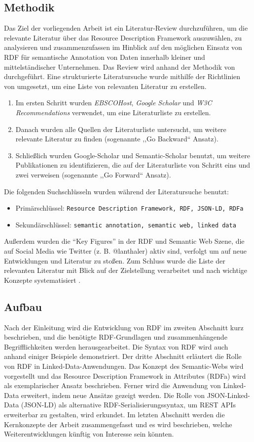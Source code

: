 \subsection{Methodik}
Das Ziel der vorliegenden Arbeit ist ein Literatur-Review durchzuführen, um die relevante Literatur über das Resource Description Framework auszuwählen, zu analysieren und zusammenzufassen im Hinblick auf den möglichen Einsatz von RDF für semantische Annotation von Daten innerhalb kleiner und mittelständischer Unternehmen. Das Review wird anhand der Methodik von \cite{fettke2006state} durchgeführt. Eine strukturierte Literatursuche wurde mithilfe der Richtlinien von \cite[S. XVI]{webster2002analyzing} umgesetzt, um eine Liste von relevanten Literatur zu erstellen. 
\begin{enumerate}
	\item Im ersten Schritt wurden \emph{EBSCOHost}, \emph{Google Scholar} und \emph{W3C Recommendations} verwendet, um eine Literaturliste zu erstellen.
	\item Danach wurden alle Quellen der Literaturliste untersucht, um weitere relevante Literatur zu finden (sogenannte ,,Go Backward`` Ansatz).
	\item Schließlich wurden Google-Scholar und Semantic-Scholar benutzt, um weitere Publikationen zu identifizieren, die auf der Literaturliste von Schritt eins und zwei verweisen (sogenannte ,,Go Forward`` Ansatz).
\end{enumerate}
Die folgenden Suchschlüsseln wurden während der Literatursuche benutzt:
\begin{itemize}
	\item Primärschlüssel: \texttt{Resource Description Framework, RDF, JSON-LD, RDFa}
	\item Sekundärschlüssel: \texttt{semantic annotation, semantic web, linked data}
\end{itemize}
Außerdem wurden die \hyphenquote{german}{Key Figures} in der RDF und Semantic Web Szene, die auf Social Media wie Twitter (z. B. @lanthaler) aktiv sind, verfolgt um auf neue Entwicklungen und Literatur zu stoßen. Zum Schluss wurde die Liste der relevanten Literatur mit Blick auf der Zielstellung verarbeitet und nach wichtige Konzepte systematisiert \parencite[vgl.][S. XVI]{webster2002analyzing}.
\subsection{Aufbau}
Nach der Einleitung wird die Entwicklung von RDF im zweiten Abschnitt kurz beschrieben, und die benötigte RDF-Grundlagen und zusammenhängende Begrifflichkeiten werden herausgearbeitet. Die Syntax von RDF wird auch anhand einiger Beispiele demonstriert. Der dritte Abschnitt erläutert die Rolle von RDF in Linked-Data-Anwendungen. Das Konzept des Semantic-Webs wird vorgestellt und das Resource Description Framework in Attributes (RDFa) wird als exemplarischer Ansatz beschrieben. Ferner wird die Anwendung von Linked-Data erweitert, indem neue Ansätze gezeigt werden. Die Rolle von JSON-Linked-Data (JSON-LD) als alternative RDF-Serialisierungssyntax, um REST APIs erweiterbar zu gestalten, wird erkundet. Im letzten Abschnitt werden die Kernkonzepte der Arbeit zusammengefasst und es wird beschrieben, welche Weiterentwicklungen künftig von Interesse sein könnten.